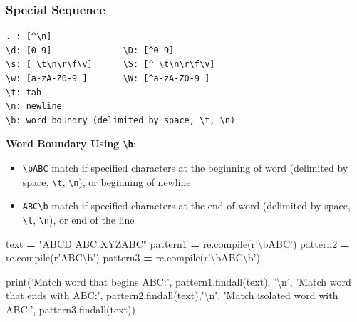 \documentclass[
]{book}
\newenvironment{Shaded}{\begin{snugshade}}{\end{snugshade}}
\newcommand{\BuiltInTok}[1]{#1}
\newcommand{\CharTok}[1]{\textcolor[rgb]{0.5,0.5,0.5}{#1}}
\newcommand{\NormalTok}[1]{#1}
\newcommand{\OperatorTok}[1]{\textcolor[rgb]{0.43,0.43,0.43}{\textbf{#1}}}
\newcommand{\StringTok}[1]{\textcolor[rgb]{0.5,0.5,0.5}{#1}}
\newcommand{\VerbatimStringTok}[1]{\textcolor[rgb]{0.5,0.5,0.5}{#1}}
\providecommand{\tightlist}{%
  \setlength{\itemsep}{0pt}\setlength{\parskip}{0pt}}
\begin{document}
\hypertarget{special-sequence}{%
\subsubsection{Special Sequence}\label{special-sequence}}

\begin{verbatim}
. : [^\n]
\d: [0-9]              \D: [^0-9]
\s: [ \t\n\r\f\v]      \S: [^ \t\n\r\f\v]
\w: [a-zA-Z0-9_]       \W: [^a-zA-Z0-9_]
\t: tab
\n: newline
\b: word boundry (delimited by space, \t, \n)
\end{verbatim}

\textbf{Word Boundary Using \texttt{\textbackslash{}b}}:

\begin{itemize}
\tightlist
\item
  \texttt{\textbackslash{}bABC} match if specified characters at the beginning of word (delimited by space, \texttt{\textbackslash{}t}, \texttt{\textbackslash{}n}), or beginning of newline\\
\item
  \texttt{ABC\textbackslash{}b} match if specified characters at the end of word (delimited by space, \texttt{\textbackslash{}t}, \texttt{\textbackslash{}n}), or end of the line
\end{itemize}

\begin{Shaded}
\begin{Highlighting}[]
\NormalTok{text }\OperatorTok{=} \StringTok{"ABCD ABC XYZABC"}
\NormalTok{pattern1 }\OperatorTok{=}\NormalTok{ re.}\BuiltInTok{compile}\NormalTok{(}\VerbatimStringTok{r'\textbackslash{}bABC'}\NormalTok{)}
\NormalTok{pattern2 }\OperatorTok{=}\NormalTok{ re.}\BuiltInTok{compile}\NormalTok{(}\VerbatimStringTok{r'ABC\textbackslash{}b'}\NormalTok{)}
\NormalTok{pattern3 }\OperatorTok{=}\NormalTok{ re.}\BuiltInTok{compile}\NormalTok{(}\VerbatimStringTok{r'\textbackslash{}bABC\textbackslash{}b'}\NormalTok{)}

\BuiltInTok{print}\NormalTok{(}\StringTok{'Match word that begins ABC:'}\NormalTok{,}
\NormalTok{  pattern1.findall(text), }\StringTok{'}\CharTok{\textbackslash{}n}\StringTok{'}\NormalTok{,}
  \StringTok{'Match word that ends with ABC:'}\NormalTok{,}
\NormalTok{  pattern2.findall(text),}\StringTok{'}\CharTok{\textbackslash{}n}\StringTok{'}\NormalTok{,}
  \StringTok{'Match isolated word with ABC:'}\NormalTok{,}
\NormalTok{  pattern3.findall(text))}
\end{Highlighting}
\end{Shaded}
\end{document}
